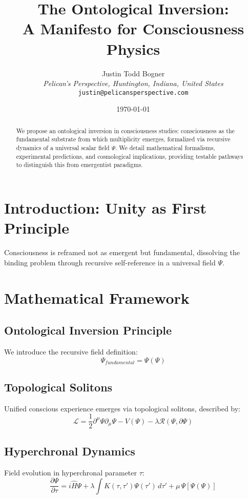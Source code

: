 \documentclass[11pt,a4paper]{article}
\title{The Ontological Inversion:\\A Manifesto for Consciousness Physics}
\author{Justin Todd Bogner \\
\small \textit{Pelican's Perspective, Huntington, Indiana, United States} \\
\small \texttt{justin@pelicansperspective.com}}
\date{\today}
\begin{document}
\maketitle

\begin{abstract}
We propose an ontological inversion in consciousness studies: consciousness as the fundamental substrate from which multiplicity emerges, formalized via recursive dynamics of a universal scalar field $\Psi$. We detail mathematical formalisms, experimental predictions, and cosmological implications, providing testable pathways to distinguish this from emergentist paradigms.
\end{abstract}

\tableofcontents

\section{Introduction: Unity as First Principle}
Consciousness is reframed not as emergent but fundamental, dissolving the binding problem through recursive self-reference in a universal field $\Psi$.

\section{Mathematical Framework}
\subsection{Ontological Inversion Principle}
We introduce the recursive field definition:
\begin{equation}
\Psi_{fundamental} = \Psi(\Psi)
\end{equation}

\subsection{Topological Solitons}
Unified conscious experience emerges via topological solitons, described by:
\begin{equation}
\mathcal{L} = \frac{1}{2}\partial^\mu \Psi \partial_\mu \Psi - V(\Psi) - \lambda \mathcal{R}(\Psi,\partial\Psi)
\end{equation}

\subsection{Hyperchronal Dynamics}
Field evolution in hyperchronal parameter $\tau$:
\begin{equation}
\frac{\partial \Psi}{\partial \tau}=i\hat H\Psi+\lambda\int K(\tau,\tau')\Psi(\tau')\,d\tau'+\mu\,\Psi[\Psi(\Psi)]
\end{equation}
\end{document}
